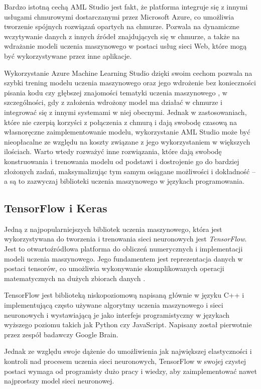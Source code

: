 Bardzo istotną cechą AML Studio jest fakt, że platforma integruje się z innymi usługami chmurowymi dostarczanymi przez Microsoft Azure, co umożliwia tworzenie spójnych rozwiązań opartych na chmurze.
Pozwala na dynamiczne wczytywanie danych z innych źródeł znajdujących się w chmurze, a także na wdrażanie modeli uczenia maszynowego w postaci usług sieci Web, które mogą być wykorzystywane przez inne aplikacje.

Wykorzystanie Azure Machine Learning Studio dzięki swoim cechom pozwala na szybki trening modelu uczenia maszynowego oraz jego wdrożenie bez konieczności pisania kodu czy głębszej znajomości tematyki uczenia maszynowego \cite{mukunthu2019practical}, w szczególności, gdy z założenia wdrożony model ma działać w chmurze i integrować się z innymi systemami w niej obecnymi.
Jednak w zastosowaniach, które nie czerpią korzyści z połączenia z chmurą i dają swobodę czasową na własnoręczne zaimplementowanie modelu, wykorzystanie AML Studio może być nieopłacalne ze względu na koszty związane z jego wykorzystaniem w większych ilościach.
Warto wtedy rozważyć inne rozwiązania, które dają swobodę konstruowania i trenowania modelu od podstawi i dostrojenie go do bardziej złożonych zadań, maksymalizując tym samym osiągane możliwości i dokładność -- a są to zazwyczaj biblioteki uczenia maszynowego w językach programowania.

\subsection{TensorFlow i Keras}
\label{sec:tensorflow-and-keras}

Jedną z najpopularniejszych bibliotek uczenia maszynowego, która jest wykorzystywana do tworzenia i trenowania sieci neuronowych jest \emph{TensorFlow}.
Jest to otwartoźródłowa platforma do obliczeń numerycznych i implementacji modeli uczenia maszynowego.
Jego fundamentem jest reprezentacja danych w postaci tensorów, co umożliwia wykonywanie skomplikowanych operacji matematycznych na dużych zbiorach danych \cite{shukla2018machine}.

TensorFlow jest biblioteką niskopoziomową napisaną głównie w języku C++ i implementującą często używane algorytmy uczenia maszynowego i sieci neuronowych i wystawiającą je jako interfejs programistyczny w językach wyższego poziomu takich jak Python czy JavaScript.
Napisany został pierwotnie przez zespół badawczy Google Brain.

Jednak ze względu swoje dążenie do umożliwienia jak największej elastyczności i kontroli nad procesem uczenia sieci neuronowych, TensorFlow w swojej czystej postaci wymaga od programisty dużo pracy i wiedzy, aby zaimplementować nawet najprostszy model sieci neuronowej.

